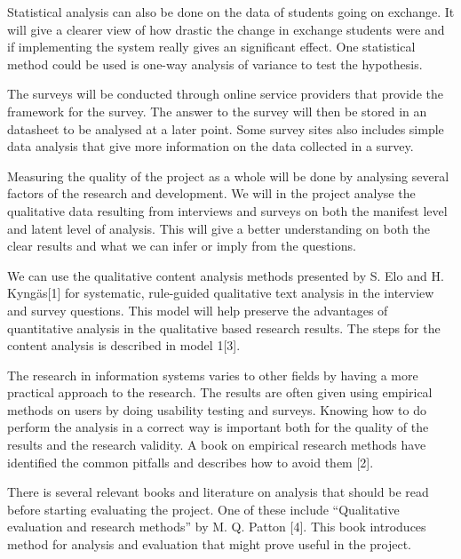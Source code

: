 Statistical analysis can also be done on the data of students going on exchange. It will give a clearer view of how drastic the change in exchange students were and if implementing the system really gives an significant effect. One statistical method could be used is one-way analysis of variance to test the hypothesis. 

The surveys will be conducted through online service providers that provide the framework for the survey. The answer to the survey will then be stored in an datasheet to be analysed at a later point. Some survey sites also includes simple data analysis that give more information on the data collected in a survey.

Measuring the quality of the project as a whole will be done by analysing several factors of the research and development. We will in the project analyse the qualitative data resulting from interviews and surveys on both the manifest level and latent level of analysis. This will give a better understanding on both the clear results and what we can infer or imply from the questions. 

We can use the qualitative content analysis methods presented by S. Elo and H. Kyngäs[1] for systematic, rule-guided qualitative text analysis in the interview and survey questions. This model will help preserve the advantages of quantitative analysis in the qualitative based research results. The steps for the content analysis is described in model 1[3]. 

The research in information systems varies to other fields by having a more practical approach to the research. The results are often given using empirical methods on users by doing usability testing and surveys. Knowing how to do perform the analysis in a correct way is important both for the quality of the results and the research validity. A book on empirical research methods have identified the common pitfalls and describes how to avoid them [2]. 

There is several relevant books and literature on analysis that should be read before starting evaluating the project. One of these include “Qualitative evaluation and research methods” by M. Q. Patton [4]. This book introduces method for analysis and evaluation that might prove useful in the project. 

